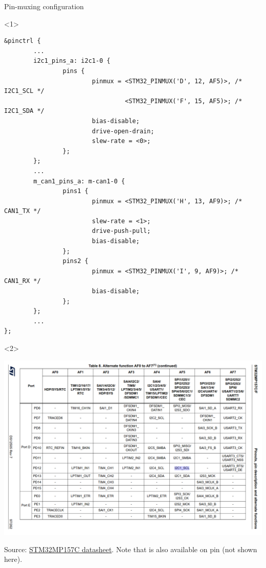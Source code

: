 \begin{frame}[fragile]{Pin-muxing configuration}
\begin{onlyenv}<1>
  \begin{block}{}
{\tiny
\begin{verbatim}
&pinctrl {
        ...
        i2c1_pins_a: i2c1-0 {
                pins {
                        pinmux = <STM32_PINMUX('D', 12, AF5)>, /* I2C1_SCL */
                                 <STM32_PINMUX('F', 15, AF5)>; /* I2C1_SDA */
                        bias-disable;
                        drive-open-drain;
                        slew-rate = <0>;
                };
        };
        ...
        m_can1_pins_a: m-can1-0 {
                pins1 {
                        pinmux = <STM32_PINMUX('H', 13, AF9)>; /* CAN1_TX */
                        slew-rate = <1>;
                        drive-push-pull;
                        bias-disable;
                };
                pins2 {
                        pinmux = <STM32_PINMUX('I', 9, AF9)>; /* CAN1_RX */
                        bias-disable;
                };
        };
        ...
};
\end{verbatim}
}
  \end{block}
\end{onlyenv}
\begin{onlyenv}<2>
  \begin{center}
    \includegraphics[height=0.78\textheight]{slides/sysdev-hw-devices/stm32mp157-i2c-pin-mux.png}
  \end{center}
  \tiny
  Source: \href{https://www.st.com/resource/en/datasheet/stm32mp157c.pdf}{STM32MP157C
  datasheet}. Note that  is also available on pin  (not shown here).
\end{onlyenv}
\end{frame}

